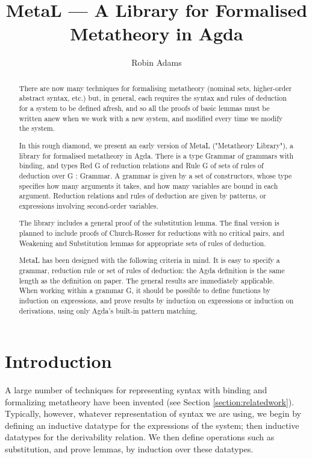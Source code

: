 \documentclass[envcountsame]{llncs}
\title{MetaL --- A Library for Formalised Metatheory in Agda}
\author{Robin Adams\inst{1}}
\institute{University of Bergen \email{r.adams@ii.uib.no}}
\begin{document}
\maketitle

\begin{abstract}
There are now many techniques for formalising metatheory (nominal sets, higher-order abstract syntax, etc.) but, in general, each requires the syntax and 
rules of deduction for a system to be defined afresh, and so all the proofs of basic lemmas must be written anew when we work with a new system, and
modified every time we modify the system. 

In this rough diamond, we present an early version of MetaL ("Metatheory Library"), a library for formalised metatheory in Agda. There is a type Grammar of 
grammars with binding, and types Red G of reduction relations and Rule G of sets of rules of deduction over G : Grammar. A grammar is given by a set of constructors, 
whose type specifies how many arguments it takes, and how many variables are bound in each argument. Reduction relations and rules of deduction are given by patterns,
or expressions involving second-order variables. 

The library includes a general proof of the substitution lemma. The final version is planned to include proofs of Church-Rosser for reductions with no critical pairs,
and Weakening and Substitution lemmas for appropriate sets of rules of deduction. 

MetaL has been designed with the following criteria in mind. It is easy to specify a grammar, reduction rule or set of rules of deduction: the Agda definition is the 
same length as the definition on paper. The general results are immediately applicable. When working within a grammar G, it should be possible to define functions by 
induction on expressions, and prove results by induction on expressions or induction on derivations, using only Agda's built-in pattern matching.
\end{abstract}


\section{Introduction}

A large number of techniques for representing syntax with binding and formalizing metatheory have been invented (see Section \ref{section:relatedwork}).
Typically, however, whatever representation of syntax we are using, we begin by defining an inductive datatype for the expressions of the system; then
inductive datatypes for the derivability relation.  We then define operations such as substitution, and prove lemmas, by induction over these datatypes.
\end{document}
